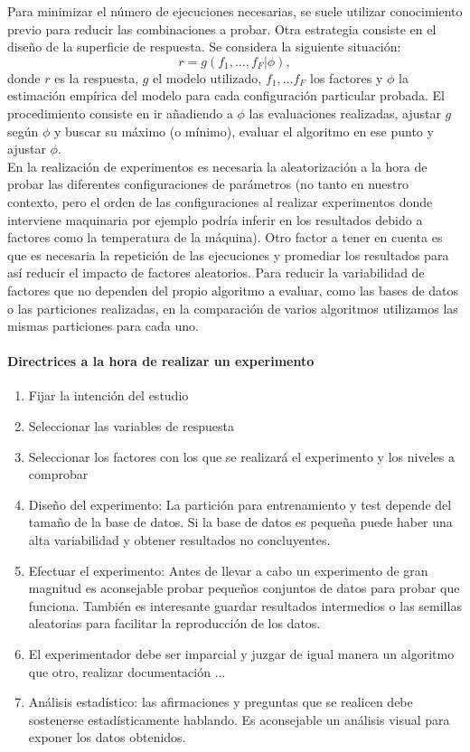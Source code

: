 	Para minimizar el número de ejecuciones necesarias, se 
suele utilizar conocimiento previo para reducir las 
combinaciones a probar. Otra estrategia consiste en el diseño 
de la superficie de respuesta. Se considera la siguiente 
situación:
		\[ r = g( f_1, \dots, f_F | \phi ), \]
	donde $r$ es la respuesta, $g$ el modelo utilizado, 
$f_1, \dots f_F$ los factores y $\phi$ la estimación empírica 
del modelo para cada configuración particular probada. El 
procedimiento consiste en ir añadiendo a $\phi$ las 
evaluaciones realizadas, ajustar $g$ según $\phi$ y buscar su 
máximo (o mínimo), evaluar el algoritmo en ese punto y 
ajustar $\phi$.\\
	En la realización de experimentos es necesaria la 
aleatorización a la hora de probar las diferentes 
configuraciones de parámetros (no tanto en nuestro contexto, 
pero el orden de las configuraciones al realizar experimentos 
donde interviene maquinaria por ejemplo podría inferir en los 
resultados debido a factores como la temperatura de la 
máquina). Otro factor a tener en cuenta es que es necesaria 
la repetición de las ejecuciones y promediar los resultados 
para así reducir el impacto de factores aleatorios. Para 
reducir la variabilidad de factores que no dependen del 
propio algoritmo a evaluar, como las bases de datos o las 
particiones realizadas, en la comparación de varios 
algoritmos utilizamos las mismas particiones para cada uno.

\paragraph{Directrices a la hora de realizar un experimento}
	\begin{enumerate}
	\item Fijar la intención del estudio
	\item Seleccionar las variables de respuesta
	\item Seleccionar los factores con los que se realizará 
		el experimento y los niveles a comprobar
	\item Diseño del experimento: La partición para 
		entrenamiento y test depende del tamaño de la base de 
		datos. Si la base de datos es pequeña puede haber una 
		alta variabilidad y obtener resultados no 
		concluyentes.
	\item Efectuar el experimento: Antes de llevar a cabo un 
		experimento de gran magnitud es aconsejable probar 
		pequeños conjuntos de datos para probar que funciona. 
		También es interesante guardar resultados intermedios 
		o las semillas aleatorias para facilitar la 
		reproducción de los datos.
	\item El experimentador debe ser imparcial y juzgar de 
		igual manera un algoritmo que otro, realizar 
		documentación ...
	\item Análisis estadístico: las afirmaciones y preguntas 
		que se realicen debe sostenerse estadísticamente 
		hablando. Es aconsejable un análisis visual para 
		exponer los datos obtenidos.
	\end{enumerate}
	
